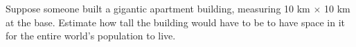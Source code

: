  Suppose someone built a gigantic apartment building,
measuring 10 km $\times$ 10 km at the base. Estimate how tall the
building would have to be to have space in it for the entire
world's population to live.
